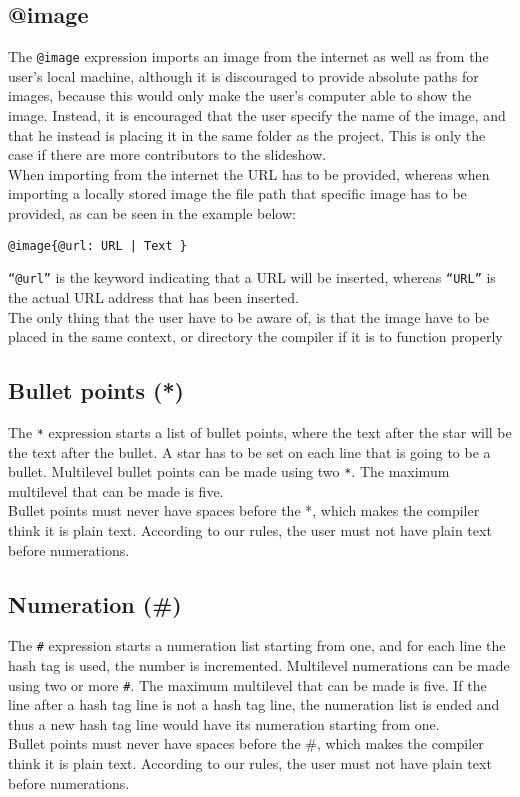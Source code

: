 \subsection{@image}
The \texttt{@image} expression imports an image from the internet as well as from the user's local machine, although it is discouraged to provide absolute paths for images, because this would only make the user's computer able to show the image. Instead, it is encouraged that the user specify the name of the image, and that he instead is placing it in the same folder as the project. This is only the case if there are more contributors to the slideshow.\\
When importing from the internet the URL has to be provided, whereas when importing a locally stored image the file path that specific image has to be provided, as can be seen in the example below:
\begin{lstlisting}[frame=single]
@image{@url: URL | Text }
\end{lstlisting}
\texttt{``@url''} is the keyword indicating that a URL will be inserted, whereas \texttt{``URL''} is the actual URL address that has been inserted. \\
The only thing that the user have to be aware of, is that the image have to be placed in the same context, or directory the compiler if it is to function properly

\subsection{Bullet points (*)}
The \texttt{*} expression starts a list of bullet points, where the text after the star will be the text after the bullet.
A star has to be set on each line that is going to be a bullet. Multilevel bullet points can be made using two \texttt{*}. The maximum multilevel that can be made is five. \\
Bullet points must never have spaces before the *, which makes the compiler think it is plain text. According to our rules, the user must not have plain text before numerations.

\subsection{Numeration (\#)}
The \texttt{\#} expression starts a numeration list starting from one, and for each line the hash tag is used, the number is incremented. Multilevel numerations can be made using two or more \texttt{\#}. The maximum multilevel that can be made is five. If the line after a hash tag line is not a hash tag line, the numeration list is ended and thus a new hash tag line would have its numeration starting from one. \\
Bullet points must never have spaces before the \#, which makes the compiler think it is plain text. According to our rules, the user must not have plain text before numerations.

